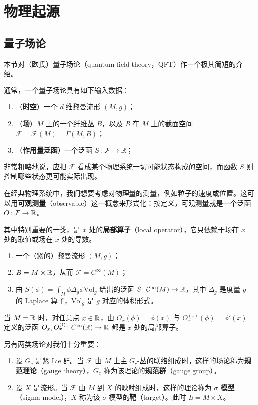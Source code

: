 \section{物理起源}
\label{sec:physical-origin}

\subsection{量子场论}
\label{sec:QFT}

本节对（欧氏）量子场论（quantum field theory，QFT）作一个极其简短的介绍。

通常，一个量子场论具有如下输入数据：
\begin{enumerate}
	\item（\textbf{时空}）一个 $d$ 维黎曼流形 $(M,g)$；
	\item（\textbf{场}）$M$ 上的一个纤维丛 $B$，以及 $B$ 在 $M$ 上的截面空间 $\mathcal F=\mathcal{F}(M)=\Gamma(M,B)$；
	\item（\textbf{作用量泛函}）一个泛函 $S \colon\mathcal F \to \mathbb{R}$；
\end{enumerate}
非常粗略地说，应把 $\mathcal F$ 看成某个物理系统一切可能状态构成的空间，而函数 $S$ 则控制哪些状态更可能实际出现。

在经典物理系统中，我们想要考虑对物理量的测量，例如粒子的速度或位置。这可以用\textbf{可观测量}（observable）这一概念来形式化：按定义，可观测量就是一个泛函 $O \colon \mathcal{F}\to \mathbb{R}$。

其中特别重要的一类，是 $x$ 处的\textbf{局部算子}（local operator），它只依赖于场在 $x$ 处的取值或场在 $x$ 处的导数。

\begin{ex}[自由标量场论]\hfill 
\begin{enumerate}
	\item 一个（紧的）黎曼流形 $(M,g)$；
	\item $B=M\times \mathbb{R}$，从而 $\mathcal{F}=C^\infty(M)$；
	\item 由 $S(\phi)=\int_M  \phi\Delta_g \phi \mathrm{Vol}_g$ 给出的泛函 $S \colon\mathcal C^\infty(M) \to \mathbb{R}$，其中 $\Delta_g$ 是度量 $g$ 的 Laplace 算子，$\mathrm{Vol}_g$ 是 $g$ 对应的体积形式。
\end{enumerate}
当 $M=\mathbb{R}$ 时，对任意点 $x\in \mathbb{R}$，由 $O_x(\phi)= \phi(x)$ 与 $O_x^{(1)}(\phi) =  \phi'(x) $ 定义的泛函 $O_x, O_x^{(1)} \colon C^\infty(\mathbb{R}) \to \mathbb{R}$ 都是 $x$ 处的局部算子。

\end{ex}

另有两类场论对我们十分重要：
	\begin{enumerate}
		\item 设 $G_c$ 是紧 Lie 群。当 $\mathcal{F}$ 由 $M$ 上主 $G_c$-丛的联络组成时，这样的场论称为\textbf{规范理论}（gauge theory），$G_c$ 称为该理论的\textbf{规范群}（gauge group）。
		\item 设 $X$ 是流形。当 $\mathcal{F}$ 由 $M$ 到 $X$ 的映射组成时，这样的理论称为 \textbf{$\sigma$ 模型}（sigma model），$X$ 称为该 $\sigma$ 模型的\textbf{靶}（target）。此时 $B=M\times X$。  
	\end{enumerate}

